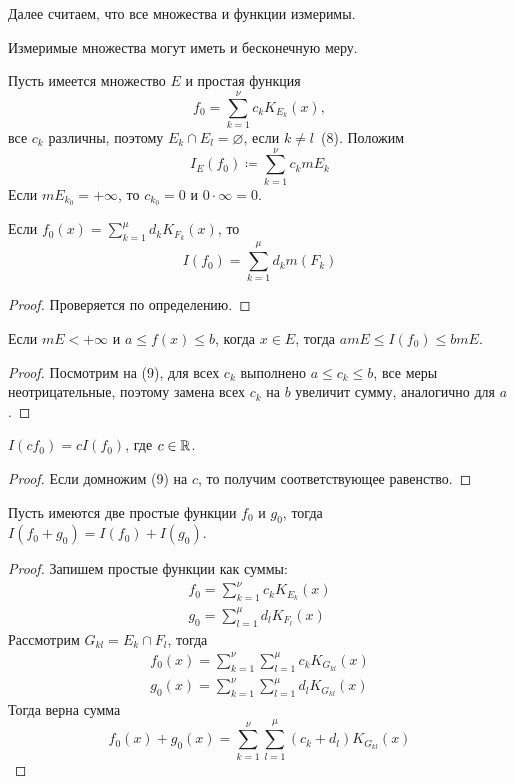 \documentclass[main]{subfiles}
\begin{document}
Далее считаем, что все множества и функции измеримы.
\begin{remark}
    Измеримые множества могут иметь и бесконечную меру.
\end{remark}
\begin{definition}
    Пусть имеется множество $E$ и простая функция
    \[f_0 = \sum_{k=1}^{\nu} c_k K_{E_k}(x), \tag{7}\]
    все $c_k$ различны, поэтому $E_k \cap E_l = \varnothing$, если $k \neq l$~(8).
    Положим
    \[I_E(f_0) \coloneq \sum_{k=1}^{\nu} c_k mE_k \tag{9}\]
    Если $m E_{k_0} = + \infty$, то $c_{k_0} = 0$ и $0 \cdot \infty = 0$.
\end{definition}

\begin{proposition}
    Если $f_0(x) = \sum_{k=1}^\mu d_k K_{F_k}(x)$, то
    \[I(f_0) = \sum_{k=1}^{\mu} d_k m(F_k) \tag{10}\]
\end{proposition}
\begin{proof}
    Проверяется по определению.
\end{proof}

\begin{proposition}
    Если $m E < +\infty$ и $a \le f(x) \le b$, когда $x \in E$, тогда $a m E \le I(f_0) \le b m E$.
\end{proposition}
\begin{proof}
    Посмотрим на (9), для всех $c_k$ выполнено $a \le c_k \le b$, все меры неотрицательные, поэтому замена всех $c_k$ на $b$ увеличит сумму, аналогично для $a$.
\end{proof}

\begin{proposition}
    $I(c f_0) = c I(f_0)$, где $c \in \mathbb{R}$.
\end{proposition}
\begin{proof}
    Если домножим (9) на $c$, то получим соответствующее равенство.
\end{proof}

\begin{proposition}
    Пусть имеются две простые функции $f_0$ и $g_0$, тогда $I(f_0 + g_0) = I(f_0) + I(g_0)$.
\end{proposition}
\begin{proof}
    Запишем простые функции как суммы:
    \begin{gather*}
        f_0 = \sum_{k=1}^{\nu} c_k K_{E_k}(x) \\
        g_0 = \sum_{l=1}^{\mu} d_l K_{F_l}(x)
    \end{gather*}
    Рассмотрим $G_{kl} = E_k \cap F_l$, тогда
    \begin{gather*}
        f_0(x) = \sum_{k=1}^{\nu} \sum_{l=1}^{\mu} c_k K_{G_{kl}}(x) \\
        g_0(x) = \sum_{k=1}^{\nu} \sum_{l=1}^{\mu} d_l K_{G_{kl}}(x)
    \end{gather*}
    Тогда верна сумма
    \[f_0(x) + g_0(x) = \sum_{k=1}^{\nu} \sum_{l=1}^{\mu} (c_k + d_l) K_{G_{kl}}(x)\]
\end{proof}
\end{document}
